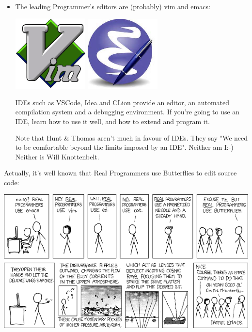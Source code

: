 \documentclass[handout]{beamer}
\begin{document}
\begin{frame}
  \begin{itemize}
    \item
       The leading Programmer's editors are (probably) \alert{vim} and \alert{emacs}:

\includegraphics[width=0.3\textwidth]{vimLogo}
\includegraphics[width=0.3\textwidth]{emacsLogo}

    \pitem IDEs such as \alert{VSCode}, \alert{Idea} and \alert{CLion}
          provide an editor, an automated compilation system
	  and a debugging environment.
	  If you're going to use an IDE,
          learn how to use it well, and
          how to extend and program it.

     \pitem
     Note that \alert{Hunt \& Thomas} aren't much in favour of IDEs.
     They say "We need to be comfortable beyond the limits imposed by an IDE".
     Neither am I:-)  Neither is Will Knottenbelt.
  \end{itemize}
\end{frame}

\begin{frame}
Actually, it's well known that \alert{Real Programmers use Butterflies}
to edit source code:

\centering
\vspace{10pt}
\includegraphics[height=0.8\textheight]{real_programmers.png}

\end{frame}
\end{document}

